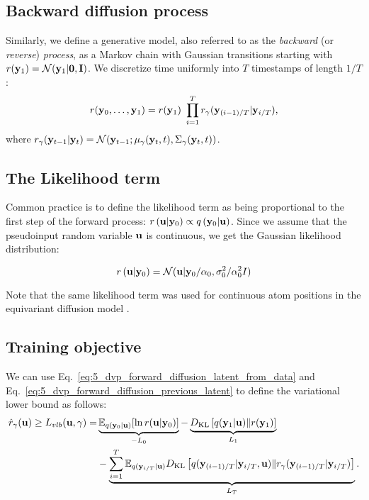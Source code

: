 \subsection*{Backward diffusion process}
Similarly, we define a generative model, also referred to as the \textit{backward} (or \textit{reverse}) \textit{process}, as a Markov chain with Gaussian transitions starting with $r({\mathbf{y}}_1) = \mathcal{N}({\mathbf{y}}_{1}| \boldsymbol{0}, \mathbf{I})$. We discretize time uniformly into $T$ timestamps of length $1/T$:
\begin{equation} \label{eq:5_dvp_backward_diffusion}
    r(\rvy_0, \ldots, \rvy_{1}) = r(\rvy_1)\ \prod_{i=1}^{T} r_{\gamma}(\rvy_{(i-1)/T} | \rvy_{i/T}),
\end{equation}
where $r_{\gamma}({\mathbf{y}}_{t-1} | {\mathbf{y}}_{t}) = \mathcal{N}({\mathbf{y}}_{t-1}; \mu_{\gamma}({\mathbf{y}}_{t}, t), \Sigma_{\gamma}({\mathbf{y}}_{t}, t))$.

\subsection*{The Likelihood term}

Common practice is to define the likelihood term as being proportional to the first step of the forward process: $r\left({\mathbf{u}}| {\mathbf{y}}_{0} \right) \propto q\left( {\mathbf{y}}_{0} |{\mathbf{u}}\right)$. Since we assume that the pseudoinput random variable ${\mathbf{u}}$ is continuous, we get the Gaussian likelihood distribution:

\begin{equation}
    r\left({\mathbf{u}}| {\mathbf{y}}_{0} \right) = \mathcal{N}({\mathbf{u}} | {\mathbf{y}}_0 / \alpha_0, \sigma_0^2 / \alpha_0^2 I)
\end{equation}

Note that the same likelihood term was used for continuous atom positions in the equivariant diffusion model \citep{hoogeboom2022equivariant}.


\subsection*{Training objective}

We can use Eq.~\ref{eq:5_dvp_forward_diffusion_latent_from_data} and Eq.~\ref{eq:5_dvp_forward_diffusion_previous_latent} to define the variational lower bound as follows:
\begin{align} \label{eq:diff_elbo_appx}
    \hat{r}_{\gamma}(\rvu) \geq L_{vlb}(\rvu, \gamma) = & \underbrace{\E_{q(\rvy_0|\rvu)}[\ln r(\rvu|\rvy_0)]}_{-L_0} %
    - \underbrace{\KL{q(\rvy_1 |\rvu)}{r(\rvy_1)}}_{L_1}  \\
    & - \underbrace{\sum_{i=1}^T \E_{q(\rvy_{i/T}|\rvu)} \KL{q(\rvy_{(i-1)/T}|\rvy_{i/T}, \rvu)}{r_{\gamma}(\rvy_{(i-1)/T}|\rvy_{i/T})}}_{L_{T}}. \notag
\end{align}

